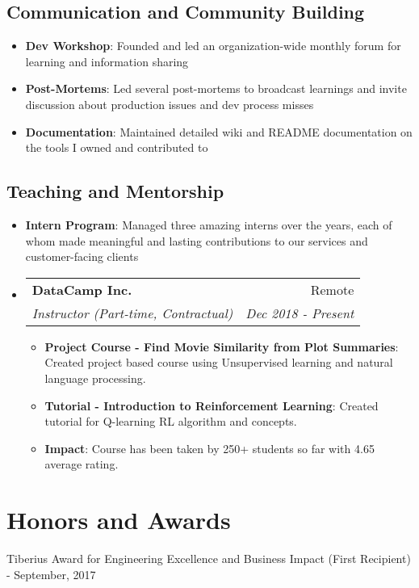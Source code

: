 \documentclass[a4paper,20pt]{article}
\makeatletter
\newcommand{\resumeItem}[2]{
  \item\small{
    \textbf{#1}{: #2 \vspace{-2pt}}
  }
}
\newcommand{\resumeSubheading}[4]{
  \vspace{-1pt}\item
    \begin{tabular*}{0.97\textwidth}{l@{\extracolsep{\fill}}r}
      \textbf{#1} & #2 \\
      \textit{#3} & \textit{#4} \\
    \end{tabular*}\vspace{-5pt}
}
\newcommand{\resumeSubHeadingListEnd}{\end{itemize}}
\newcommand{\resumeItemListStart}{\begin{itemize}}
\newcommand{\resumeItemListEnd}{\end{itemize}\vspace{-5pt}}
\makeatother
\begin{document}
{    \subsection{Communication and Community Building}
      \resumeItemListStart
        \resumeItem{Dev Workshop}{Founded and led an organization-wide monthly forum for learning and information sharing}
        \resumeItem{Post-Mortems}{Led several post-mortems to broadcast learnings and invite discussion about production issues and dev process misses}
        \resumeItem{Documentation}{Maintained detailed wiki and README documentation on the tools I owned and contributed to}
      \resumeItemListEnd

    \subsection{Teaching and Mentorship}
      \resumeItemListStart
        \resumeItem{Intern Program}{Managed three amazing interns over the years, each of whom made meaningful and lasting contributions to our services and customer-facing clients}

\vspace{-5pt}
    \resumeSubheading
		{DataCamp Inc.}{Remote}
		{Instructor (Part-time, Contractual)}{Dec 2018 -  Present}
		\resumeItemListStart
        \resumeItem{Project Course - Find Movie Similarity from Plot Summaries}
          {Created project based course using Unsupervised learning and natural language processing.}
        \resumeItem{Tutorial - Introduction to Reinforcement Learning}
          {Created tutorial for Q-learning RL algorithm and  concepts.}
        \resumeItem{Impact}{Course has been taken by 250+ students so far with 4.65 average rating.}
		\resumeItemListEnd

\resumeSubHeadingListEnd

\vspace{-5pt}
\section{Honors and Awards}
\begin{description}[font=$\bullet$]
    \item {Tiberius Award for Engineering Excellence and Business Impact (First Recipient) - September, 2017}

\end{description}

\vspace{-5pt}
}
\end{document}
